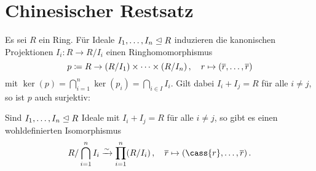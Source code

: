 \section{Chinesischer Restsatz}

Es sei $R$ ein Ring.
Für Ideale $I_1, \dotsc, I_n \mathrel{\trianglelefteq} R$ induzieren die kanonischen Projektionen $I_i \colon R \to R/I_i$ einen Ringhomomorphismus
\[
            p
  \coloneqq  R
  \to       (R/I_1) \times \dotsb \times (R/I_n) \,,
  \quad     r
  \mapsto   (\overline{r}, \dotsc, \overline{r})
\]
mit $\ker(p) = \bigcap_{i=1}^n \ker(p_i) = \bigcap_{i \in I} I_i$.
Gilt dabei $I_i + I_j = R$ für alle $i \neq j$, so ist $p$ auch surjektiv:

\begin{theorem}
  Sind $I_1, \dotsc, I_n \mathrel{\trianglelefteq} R$ Ideale mit $I_i + I_j = R$ für alle $i \neq j$, so gibt es einen wohldefinierten Isomorphismus
  \[
                        R / \bigcap_{i=1}^n I_i
    \xrightarrow{\sim}  \prod_{i=1}^n (R/I_i) \,,
    \quad               \class{r}
    \mapsto             (\cass{r}, \dotsc, \class{r}) \,.
  \]
\end{theorem}














